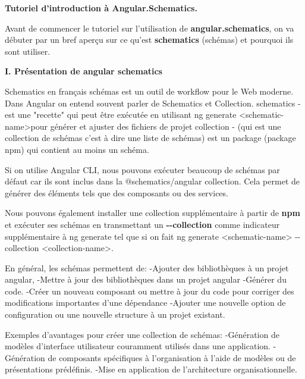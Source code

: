 \documentclass[12pt,french]{article}
\begin{document}
		\qquad\qquad\qquad\large{\textbf{Tutoriel d’introduction à Angular.Schematics.}}\newline
	
	Avant de commencer le tutoriel sur l'utilisation de \textbf{angular.schematics}, on va débuter par un bref aperçu sur ce qu'est \textbf{schematics} (schémas) et pourquoi ils sont utiliser.\newline
	
	\textbf{I. Présentation de angular schematics}\newline
	
	Schematics en français schémas est un outil de workflow pour le Web moderne.\newline
	Dans Angular on entend souvent parler de Schematics et Collection.\smallbreak
	schematics - est une "recette" qui peut être exécutée en utilisant ng generate <schematic-name>pour générer et ajuster des fichiers de projet\smallbreak
	collection - (qui est une collection de schémas c'est à dire une liste de schémas) est un package (package npm) qui contient au moins un schéma.\newline
	
	Si on utilise Angular CLI, nous pouvons exécuter beaucoup de schémas par défaut car ils sont inclus dans la @schematics/angular collection. Cela permet de générer des éléments tels que des composants ou des services.\newline
	
	Nous pouvons également installer une collection supplémentaire à partir de \textbf{npm} et exécuter ses schémas en transmettant un \textbf{\--\--collection} comme indicateur supplémentaire à ng generate tel que si on fait ng generate <schematic-name> \--\--collection <collection-name>.\newline
	
	En général, les schémas permettent de:\smallbreak
		\quad-Ajouter des bibliothèques à un projet angular,\smallbreak
		\quad-Mettre à jour des bibliothèques dans un projet angular\smallbreak
		\quad-Générer du code.\smallbreak
		\quad-Créer un nouveau composant ou mettre à jour du code pour corriger des modifications 		importantes d'une dépendance\smallbreak
		\quad-Ajouter une nouvelle option de configuration ou une nouvelle structure à un projet existant.\newline
		
		Exemples d'avantages pour créer une collection de schémas:\smallbreak
	\quad-Génération de modèles d'interface utilisateur couramment utilisés dans une application.\smallbreak
	\quad-Génération de composants spécifiques à l'organisation à l'aide de modèles ou de 	présentations prédéfinis.\smallbreak
	\quad-Mise en application de l'architecture organisationnelle.
\newline
\end{document}

